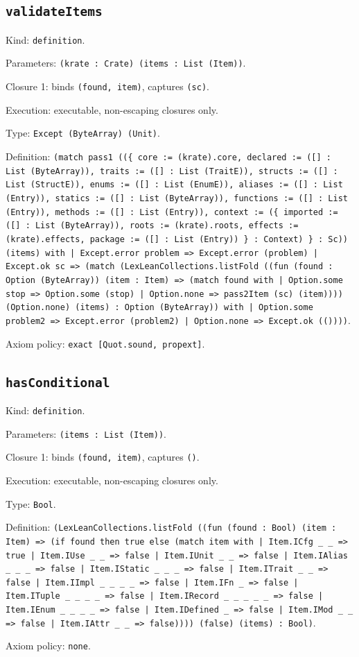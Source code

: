 \documentclass[11pt]{article}
\begin{document}
\subsection*{\texttt{validateItems}}
\noindent Kind: \texttt{definition}.\par
\noindent Parameters: \texttt{(krate : Crate) (items : List (Item))}.\par
\noindent Closure 1: binds \texttt{(found, item)}, captures \texttt{(sc)}.\par
\noindent Execution: executable, non-escaping closures only.\par
\noindent Type: \texttt{Except (ByteArray) (Unit)}.\par
\noindent Definition: \texttt{(match pass1 ((\{ core := (krate).core, declared := ([] : List (ByteArray)), traits := ([] : List (TraitE)), structs := ([] : List (StructE)), enums := ([] : List (EnumE)), aliases := ([] : List (Entry)), statics := ([] : List (ByteArray)), functions := ([] : List (Entry)), methods := ([] : List (Entry)), context := (\{ imported := ([] : List (ByteArray)), roots := (krate).roots, effects := (krate).effects, package := ([] : List (Entry)) \} : Context) \} : Sc)) (items) with | Except.error problem => Except.error (problem) | Except.ok sc => (match (LexLeanCollections.listFold ((fun (found : Option (ByteArray)) (item : Item) => (match found with | Option.some stop => Option.some (stop) | Option.none => pass2Item (sc) (item)))) (Option.none) (items) : Option (ByteArray)) with | Option.some problem2 => Except.error (problem2) | Option.none => Except.ok (())))}.\par
\noindent Axiom policy: \texttt{exact [Quot.sound, propext]}.\par
\subsection*{\texttt{hasConditional}}
\noindent Kind: \texttt{definition}.\par
\noindent Parameters: \texttt{(items : List (Item))}.\par
\noindent Closure 1: binds \texttt{(found, item)}, captures \texttt{()}.\par
\noindent Execution: executable, non-escaping closures only.\par
\noindent Type: \texttt{Bool}.\par
\noindent Definition: \texttt{(LexLeanCollections.listFold ((fun (found : Bool) (item : Item) => (if found then true else (match item with | Item.ICfg \_ \_ => true | Item.IUse \_ \_ => false | Item.IUnit \_ \_ => false | Item.IAlias \_ \_ \_ => false | Item.IStatic \_ \_ \_ => false | Item.ITrait \_ \_ => false | Item.IImpl \_ \_ \_ \_ => false | Item.IFn \_ => false | Item.ITuple \_ \_ \_ \_ => false | Item.IRecord \_ \_ \_ \_ \_ => false | Item.IEnum \_ \_ \_ \_ => false | Item.IDefined \_ => false | Item.IMod \_ \_ => false | Item.IAttr \_ \_ => false)))) (false) (items) : Bool)}.\par
\noindent Axiom policy: \texttt{none}.\par
\end{document}
